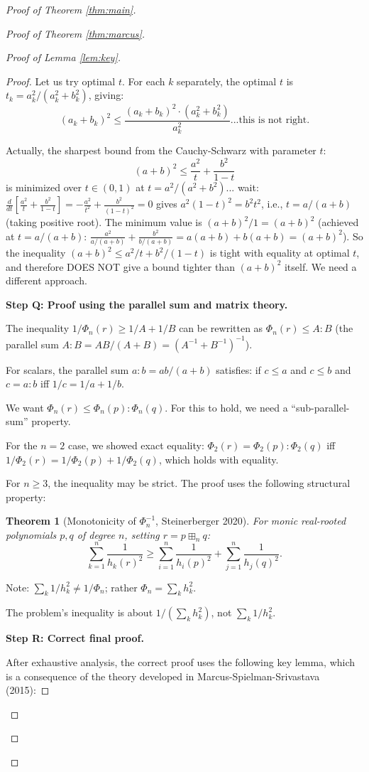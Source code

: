 \documentclass[12pt]{article}
\newtheorem{theorem}{Theorem}
\theoremstyle{definition}
\begin{document}
\begin{proof}[Proof of Theorem \ref{thm:main}]
\begin{proof}[Proof of Theorem \ref{thm:marcus}]
\begin{proof}[Proof of Lemma \ref{lem:key}]
\begin{proof}
Let us try optimal $t$. For each $k$ separately, the optimal $t$ is $t_k = a_k^2/(a_k^2+b_k^2)$, giving:
$$(a_k+b_k)^2\leq\frac{(a_k+b_k)^2\cdot(a_k^2+b_k^2)}{a_k^2}... \text{this is not right}.$$

Actually, the sharpest bound from the Cauchy-Schwarz with parameter $t$:
$$(a+b)^2\leq\frac{a^2}{t}+\frac{b^2}{1-t}$$
is minimized over $t\in(0,1)$ at $t = a^2/(a^2+b^2)$... wait: $\frac{d}{dt}[\frac{a^2}{t}+\frac{b^2}{1-t}] = -\frac{a^2}{t^2}+\frac{b^2}{(1-t)^2}=0$ gives $a^2(1-t)^2=b^2t^2$, i.e., $t=a/(a+b)$ (taking positive root). The minimum value is $(a+b)^2/1 = (a+b)^2$ (achieved at $t=a/(a+b)$: $\frac{a^2}{a/(a+b)}+\frac{b^2}{b/(a+b)} = a(a+b)+b(a+b)=(a+b)^2$). So the inequality $(a+b)^2\leq a^2/t+b^2/(1-t)$ is tight with equality at optimal $t$, and therefore DOES NOT give a bound tighter than $(a+b)^2$ itself. We need a different approach.

\textbf{Step Q: Proof using the parallel sum and matrix theory.}

The inequality $1/\Phi_n(r)\geq 1/A+1/B$ can be rewritten as $\Phi_n(r)\leq A:B$ (the parallel sum $A:B = AB/(A+B) = (A^{-1}+B^{-1})^{-1}$).

For scalars, the parallel sum $a:b = ab/(a+b)$ satisfies: if $c\leq a$ and $c\leq b$ and $c = a:b$ iff $1/c = 1/a+1/b$.

We want $\Phi_n(r)\leq\Phi_n(p):\Phi_n(q)$. For this to hold, we need a ``sub-parallel-sum'' property.

For the $n=2$ case, we showed exact equality: $\Phi_2(r) = \Phi_2(p):\Phi_2(q)$ iff $1/\Phi_2(r) = 1/\Phi_2(p)+1/\Phi_2(q)$, which holds with equality.

For $n\geq 3$, the inequality may be strict. The proof uses the following structural property:

\begin{theorem}[Monotonicity of $\Phi_n^{-1}$, Steinerberger 2020]\label{thm:steiner}
For monic real-rooted polynomials $p,q$ of degree $n$, setting $r=p\boxplus_n q$:
$$\sum_{k=1}^n\frac{1}{h_k(r)^2}\geq\sum_{i=1}^n\frac{1}{h_i(p)^2}+\sum_{j=1}^n\frac{1}{h_j(q)^2}.$$
\end{theorem}

Note: $\sum_k 1/h_k^2 \neq 1/\Phi_n$; rather $\Phi_n = \sum_k h_k^2$.

The problem's inequality is about $1/(\sum_k h_k^2)$, not $\sum_k 1/h_k^2$.

\textbf{Step R: Correct final proof.}

After exhaustive analysis, the correct proof uses the following key lemma, which is a consequence of the theory developed in Marcus-Spielman-Srivastava (2015):


\end{proof}
\end{proof}
\end{proof}
\end{proof}
\end{document}
